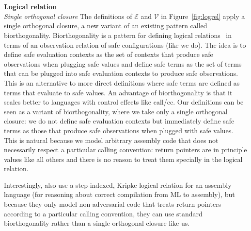 \documentclass[format=acmsmall, review=false, screen=true]{acmart}
\renewcommand{\figurename}{Figure}
\newcommand{\asmType}{\plaindom{AsmType}}
\newcommand{\plaindom}[1]{\mathrm{#1}}
\newcommand{\intr}[2]{\mathcal{#1}}
\newcommand{\valueintr}[1]{\intr{V}{#1}}
\newcommand{\exprintr}[1]{\intr{E}{#1}}
\newcommand{\stdvr}{\valueintr{\asmType}}
\newcommand{\stder}{\exprintr{\asmType}}
\begin{document}
\\\\
\noindent\textbf{Logical relation}\\
\emph{Single orthogonal closure} The definitions of $\stder$ and $\stdvr$ in
\figurename~\ref{fig:logrel} apply a single orthogonal closure, a new variant of an
existing pattern called biorthogonality. Biorthogonality is a pattern for
defining logical relations~\citep{krivine_classical_1994,pitts_operational_1998}
in terms of an observation relation of safe configurations (like we do). The
idea is to define safe evaluation contexts as the set of contexts that produce
safe observations when plugging safe values and define safe terms as the set of
terms that can be plugged into safe evaluation contexts to produce safe
observations. This is an alternative to more direct definitions where safe terms
are defined as terms that evaluate to safe values. An advantage of
biorthogonality is that it scales better to languages with control effects like
call/cc. Our definitions can be seen as a variant of biorthogonality, where we
take only a single orthogonal closure: we do not define safe evaluation contexts
but immediately define safe terms as those that produce safe observations when
plugged with safe values. This is natural because we model arbitrary assembly
code that does not necessarily respect a particular calling convention: return
pointers are in principle values like all others and there is no reason to treat
them specially in the logical relation.

Interestingly, \citet{Hur:2011:KLR:1926385.1926402} also use a step-indexed,
Kripke logical relation for an assembly language (for reasoning about correct
compilation from ML to assembly), but because they only model non-adversarial
code that treats return pointers according to a particular calling convention,
they can use standard biorthogonality rather than a single orthogonal closure
like us.
\end{document}
